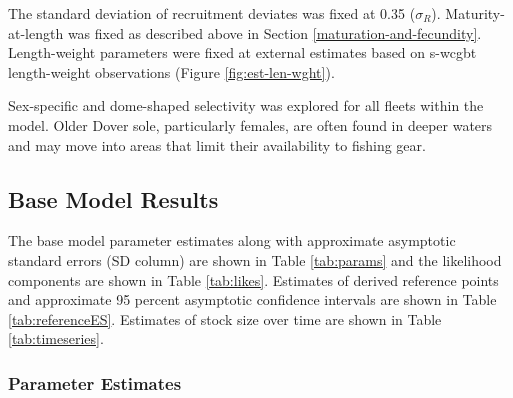 \documentclass[11pt,
  english,
  a4paper,
]{article}
\begin{document}
\leavevmode\tagmcend\tagstructend\par


The standard deviation of recruitment deviates was fixed at 0.35 ({\(\sigma_R\)\leavevmode\tagmcend\tagstructend}). Maturity-at-length was fixed as described above in Section \ref{maturation-and-fecundity}. Length-weight parameters were fixed at external estimates based on \gls{s-wcgbt} length-weight observations (Figure \ref{fig:est-len-wght}).

\leavevmode\tagmcend\tagstructend\par


Sex-specific and dome-shaped selectivity was explored for all fleets within the model. Older Dover sole, particularly females, are often found in deeper waters and may move into areas that limit their availability to fishing gear.

\leavevmode\tagmcend\tagstructend\par


\hypertarget{base-model-results}{%
\subsection{Base Model Results}\label{base-model-results}}

\leavevmode\tagmcend\tagstructend


The base model parameter estimates along with approximate asymptotic standard errors (SD column) are shown in Table \ref{tab:params} and the likelihood components are shown in Table \ref{tab:likes}. Estimates of derived reference points and approximate 95 percent asymptotic confidence intervals are shown in Table \ref{tab:referenceES}. Estimates of stock size over time are shown in Table \ref{tab:timeseries}.

\leavevmode\tagmcend\tagstructend\par


\hypertarget{parameter-estimates}{%
\subsubsection{Parameter Estimates}\label{parameter-estimates}}
\end{document}
